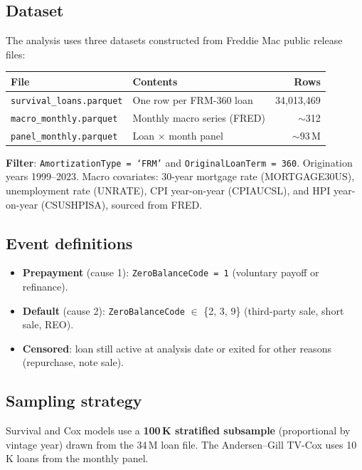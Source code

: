 \documentclass[11pt,a4paper]{article}
\begin{document}
\subsection{Dataset}

The analysis uses three datasets constructed from Freddie Mac public
release files:

\begin{center}
\begin{tabular}{llr}
\toprule
\textbf{File} & \textbf{Contents} & \textbf{Rows} \\
\midrule
\texttt{survival\_loans.parquet}  & One row per FRM-360 loan  & 34{,}013{,}469 \\
\texttt{macro\_monthly.parquet}   & Monthly macro series (FRED) & $\sim$312 \\
\texttt{panel\_monthly.parquet}   & Loan $\times$ month panel & $\sim$93\,M \\
\bottomrule
\end{tabular}
\end{center}

\textbf{Filter}: \texttt{AmortizationType = `FRM'} and
\texttt{OriginalLoanTerm = 360}. Origination years 1999--2023.
Macro covariates: 30-year mortgage rate (MORTGAGE30US), unemployment
rate (UNRATE), CPI year-on-year (CPIAUCSL), and HPI year-on-year
(CSUSHPISA), sourced from FRED.

\subsection{Event definitions}

\begin{itemize}[leftmargin=1.4em,itemsep=1pt]
  \item \textbf{Prepayment} (cause 1): \texttt{ZeroBalanceCode = 1}
        (voluntary payoff or refinance).
  \item \textbf{Default} (cause 2): \texttt{ZeroBalanceCode} $\in$
        \{2, 3, 9\} (third-party sale, short sale, REO).
  \item \textbf{Censored}: loan still active at analysis date or exited
        for other reasons (repurchase, note sale).
\end{itemize}

\subsection{Sampling strategy}

Survival and Cox models use a \textbf{100\,K stratified subsample}
(proportional by vintage year) drawn from the 34\,M loan file.
The Andersen--Gill TV-Cox uses 10\,K loans from the monthly panel.
\end{document}
